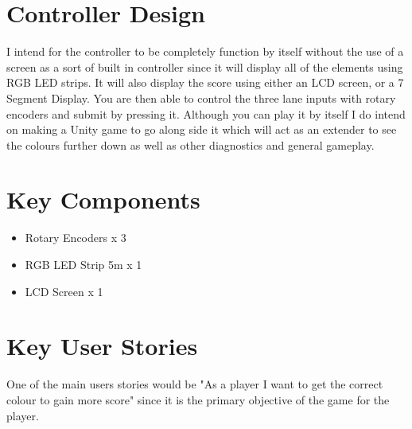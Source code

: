 \documentclass{article}
\begin{document}
\section{Controller Design}

I intend for the controller to be completely function by itself without the use of a screen as a sort of built in controller since it will display all of the elements using RGB LED strips. It will also display the score using either an LCD screen, or a 7 Segment Display. You are then able to control the three lane inputs with rotary encoders and submit by pressing it. Although you can play it by itself I do intend on making a Unity game to go along side it which will act as an extender to see the colours further down as well as other diagnostics and general gameplay.

\section{Key Components}

\begin{itemize}
    \item Rotary Encoders x 3
    \item RGB LED Strip 5m x 1
    \item LCD Screen x 1
\end{itemize}

\section{Key User Stories}

One of the main users stories would be "As a player I want to get the correct colour to gain more score" since it is the primary objective of the game for the player.
\end{document}
